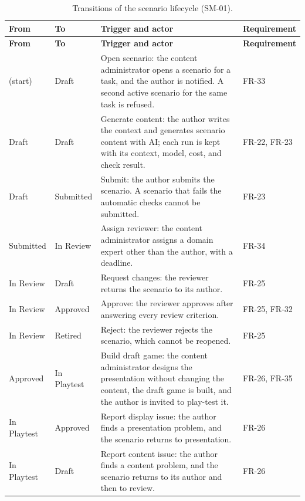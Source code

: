 {\small
\begin{longtable}{|>{\raggedright\arraybackslash}p{}|>{\raggedright\arraybackslash}p{}|>{\raggedright\arraybackslash}p{}|>{\raggedright\arraybackslash}p{}|}
\caption{Transitions of the scenario lifecycle (SM-01).} \\
\hline
\textbf{From} & \textbf{To} & \textbf{Trigger and actor} & \textbf{Requirement} \\ \hline
\endfirsthead
\hline
\textbf{From} & \textbf{To} & \textbf{Trigger and actor} & \textbf{Requirement} \\ \hline
\endhead
(start) & Draft & Open scenario: the content administrator opens a scenario for a task, and the author is notified. A second active scenario for the same task is refused. & FR-33 \\ \hline
Draft & Draft & Generate content: the author writes the context and generates scenario content with AI; each run is kept with its context, model, cost, and check result. & FR-22, FR-23 \\ \hline
Draft & Submitted & Submit: the author submits the scenario. A scenario that fails the automatic checks cannot be submitted. & FR-23 \\ \hline
Submitted & In Review & Assign reviewer: the content administrator assigns a domain expert other than the author, with a deadline. & FR-34 \\ \hline
In Review & Draft & Request changes: the reviewer returns the scenario to its author. & FR-25 \\ \hline
In Review & Approved & Approve: the reviewer approves after answering every review criterion. & FR-25, FR-32 \\ \hline
In Review & Retired & Reject: the reviewer rejects the scenario, which cannot be reopened. & FR-25 \\ \hline
Approved & In Playtest & Build draft game: the content administrator designs the presentation without changing the content, the draft game is built, and the author is invited to play-test it. & FR-26, FR-35 \\ \hline
In Playtest & Approved & Report display issue: the author finds a presentation problem, and the scenario returns to presentation. & FR-26 \\ \hline
In Playtest & Draft & Report content issue: the author finds a content problem, and the scenario returns to its author and then to review. & FR-26 \\ \hline

\end{longtable}}
